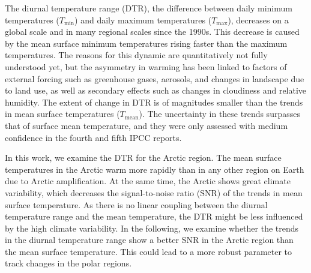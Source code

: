The diurnal temperature range (DTR), the difference between daily minimum temperatures ($T_{\mathrm{min}}$) and daily maximum temperatures ($T_{\mathrm{max}}$), decreases on a global scale and in many regional scales since the 1990s. This decrease is caused by the mean surface minimum temperatures rising faster than the maximum temperatures. The reasons for this dynamic are quantitatively not fully understood yet, but the asymmetry in warming has been linked to factors of external forcing such as greenhouse gases, aerosols, and changes in landscape due to land use, as well as secondary effects such as changes in cloudiness and relative humidity. The extent of change in DTR is of magnitudes smaller than the trends in mean surface temperatures ($T_{\mathrm{mean}}$). The uncertainty in these trends surpasses that of surface mean temperature, and they were only assessed with medium confidence in the fourth and fifth IPCC reports.

In this work, we examine the DTR for the Arctic region. The mean surface temperatures in the Arctic warm more rapidly than in any other region on Earth due to Arctic amplification. At the same time, the Arctic shows great climate variability, which decreases the signal-to-noise ratio (SNR) of the trends in mean surface temperature. As there is no linear coupling between the diurnal temperature range and the mean temperature, the DTR might be less influenced by the high climate variability. In the following, we examine whether the trends in the diurnal temperature range show a better SNR in the Arctic region than the mean surface temperature. This could lead to a more robust parameter to track changes in the polar regions.


